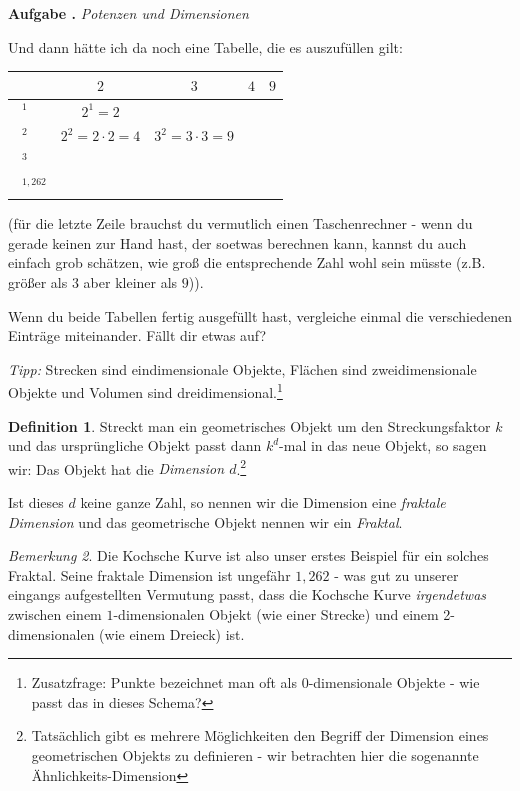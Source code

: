 \documentclass[a4paper,ngerman,12pt]{scrartcl}
\theoremstyle{definition}
\newtheorem{defn}{Definition}[]
\theoremstyle{plain}
\theoremstyle{remark}
\newtheorem{bem}[defn]{Bemerkung}
\newlength{\aufgabenskip}
\newcounter{aufgabennummer}
\newenvironment{aufgabe}[1]{
  \addtocounter{aufgabennummer}{1}
  \textbf{Aufgabe \theaufgabennummer.} \emph{#1} \par
}{\vspace{\aufgabenskip}}
\begin{document}
\newpage

\begin{aufgabe}{Potenzen und Dimensionen}
Und dann hätte ich da noch eine Tabelle, die es auszufüllen gilt:
\begin{center}
	\renewcommand{\arraystretch}{2}
	\begin{tabular}{l||c|c|c|c}
				      & $2$ & $3$ & $4$ & $9$ \\\hline\hline
		$\boxed{\phantom{1}}^1$  & $2^1=2$	&   &  & \\\hline
		$\boxed{\phantom{1}}^2$  & $2^2=2\cdot 2=4$	& $3^2=3\cdot 3=9$ & \phantom{$4^2=16$} & \phantom{$9^2=81$}\\\hline
		$\boxed{\phantom{1}}^3$  & 	&   &  & \\\hline
		$\boxed{\phantom{1}}^{1,262}$  & 	&   &  &     	
	\end{tabular}
\end{center}
(für die letzte Zeile brauchst du vermutlich einen Taschenrechner - wenn du gerade keinen zur Hand hast, der soetwas berechnen kann, kannst du auch einfach grob schätzen, wie groß die entsprechende Zahl wohl sein müsste (z.B. größer als $3$ aber kleiner als $9$)).

Wenn du beide Tabellen fertig ausgefüllt hast, vergleiche einmal die verschiedenen Einträge miteinander. Fällt dir etwas auf?

\emph{Tipp:} Strecken sind eindimensionale Objekte, Flächen sind zweidimensionale Objekte und Volumen sind dreidimensional.\footnote{Zusatzfrage: Punkte bezeichnet man oft als 0-dimensionale Objekte - wie passt das in dieses Schema?}
\end{aufgabe}

\begin{defn}
Streckt man ein geometrisches Objekt um den Streckungsfaktor $k$ und das ursprüngliche Objekt passt dann $k^d$-mal in das neue Objekt, so sagen wir: Das Objekt hat die \emph{Dimension $d$}.\footnote{Tatsächlich gibt es mehrere Möglichkeiten den Begriff der Dimension eines geometrischen Objekts zu definieren - wir betrachten hier die sogenannte \glqq Ähnlichkeits-Dimension\grqq{}}

Ist dieses $d$ keine ganze Zahl, so nennen wir die Dimension eine \emph{fraktale Dimension} und das geometrische Objekt nennen wir ein \emph{Fraktal}.
\end{defn}

\begin{bem}
Die Kochsche Kurve ist also unser erstes Beispiel für ein solches Fraktal. Seine fraktale Dimension ist ungefähr $1,262$ - was gut zu unserer eingangs aufgestellten Vermutung passt, dass die Kochsche Kurve \emph{irgendetwas} zwischen einem $1$-dimensionalen Objekt (wie einer Strecke) und einem 2-dimensionalen (wie einem Dreieck) ist.
\end{bem}
\end{document}

